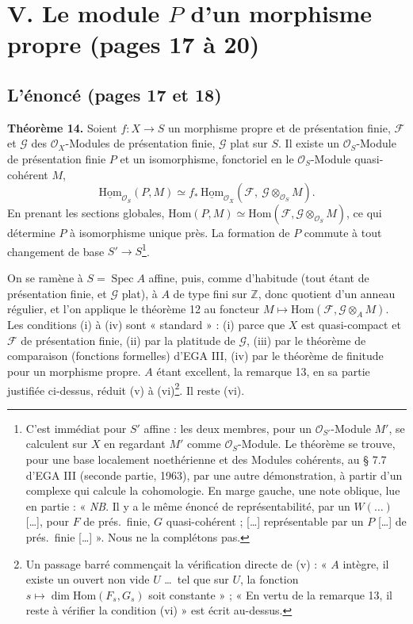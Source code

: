 \documentclass[11pt,a4paper]{article}
\begin{document}
\section*{V. Le module $P$ d'un morphisme propre (pages 17 à 20)}

\subsection*{L'énoncé (pages 17 et 18)}

\textbf{Théorème 14.} Soient $f \colon X \to S$ un morphisme propre et de
présentation finie, $\mathcal{F}$ et $\mathcal{G}$ des $\mathcal{O}_X$-Modules
de présentation finie, $\mathcal{G}$ plat sur $S$. Il existe un
$\mathcal{O}_S$-Module de présentation finie $P$ et un isomorphisme,
fonctoriel en le $\mathcal{O}_S$-Module quasi-cohérent $M$,
\[
  \underline{\mathrm{Hom}}_{\mathcal{O}_S}(P, M) \simeq
  f_{*}\,\underline{\mathrm{Hom}}_{\mathcal{O}_X}(\mathcal{F},\ \mathcal{G}
  \otimes_{\mathcal{O}_S} M) .
\]
En prenant les sections globales, $\mathrm{Hom}(P, M) \simeq
\mathrm{Hom}(\mathcal{F}, \mathcal{G} \otimes_{\mathcal{O}_S} M)$, ce qui
détermine $P$ à isomorphisme unique près. La formation de $P$ commute à tout
changement de base $S' \to S$\footnote{C'est immédiat pour $S'$ affine : les
deux membres, pour un $\mathcal{O}_{S'}$-Module $M'$, se calculent sur $X$ en
regardant $M'$ comme $\mathcal{O}_S$-Module. Le théorème se trouve, pour une
base localement noethérienne et des Modules cohérents, au § 7.7 d'EGA III
(seconde partie, 1963), par une autre démonstration, à partir d'un complexe
qui calcule la cohomologie. En marge gauche, une note oblique, lue en partie :
« \emph{NB}. Il y a le même énoncé de représentabilité, par un $W(\ldots)$
[\ldots], pour $F$ de prés.\ finie, $G$ quasi-cohérent ; [\ldots] représentable
par un $P$ [\ldots] de prés.\ finie [\ldots] ». Nous ne la complétons pas.}.

On se ramène à $S = \operatorname{Spec} A$ affine, puis, comme d'habitude
(tout étant de présentation finie, et $\mathcal{G}$ plat), à $A$ de type
fini sur $\mathbb{Z}$, donc quotient d'un anneau régulier, et l'on applique le
théorème 12 au foncteur $M \mapsto \mathrm{Hom}(\mathcal{F}, \mathcal{G}
\otimes_A M)$. Les conditions (i) à (iv) sont « standard » : (i) parce que $X$
est quasi-compact et $\mathcal{F}$ de présentation finie, (ii) par la
platitude de $\mathcal{G}$, (iii) par le théorème de comparaison (fonctions
formelles) d'EGA III, (iv) par le théorème de finitude pour un morphisme
propre. $A$ étant excellent, la remarque 13, en sa partie justifiée ci-dessus,
réduit (v) à (vi)\footnote{Un passage barré commençait la vérification directe
de (v) : « $A$ intègre, il existe un ouvert non vide $U$ \ldots\ tel que sur
$U$, la fonction $s \mapsto \dim \mathrm{Hom}(F_s, G_s)$ soit constante » ;
« En vertu de la remarque 13, il reste à vérifier la condition (vi) » est écrit
au-dessus.}. Il reste (vi).
\end{document}

